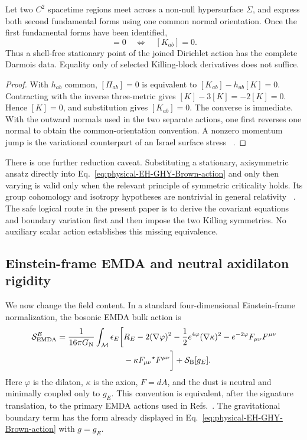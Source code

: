 \begin{proposition}
\label{prop:physical-Darmois-momentum}
Let two $C^2$ spacetime regions meet across a non-null hypersurface
$\Sigma$, and express both second fundamental forms using one common normal
orientation. Once the first fundamental forms have been identified,
\begin{equation}
 [\Pi_{ab}]=0
 \quad\Longleftrightarrow\quad
 [K_{ab}]=0.
 \label{eq:physical-momentum-Darmois-equivalence}
\end{equation}
Thus a shell-free stationary point of the joined Dirichlet action has the
complete Darmois data. Equality only of selected Killing-block derivatives
does not suffice.
\end{proposition}

\begin{proof}
With $h_{ab}$ common, $[\Pi_{ab}]=0$ is equivalent to
$[K_{ab}]-h_{ab}[K]=0$. Contracting with the inverse three-metric gives
$[K]-3[K]=-2[K]=0$. Hence $[K]=0$, and substitution gives
$[K_{ab}]=0$. The converse is immediate. With the outward normals used in
the two separate actions, one first reverses one normal to obtain the
common-orientation convention. A nonzero momentum jump is the variational
counterpart of an Israel surface stress
~\cite{Darmois1927,Israel1966NCB,MarsSenovilla1993CQG}.
\end{proof}

There is one further reduction caveat. Substituting a stationary,
axisymmetric ansatz directly into
Eq.~\eqref{eq:physical-EH-GHY-Brown-action} and only then varying is valid
only when the relevant principle of symmetric criticality holds. Its group
cohomology and isotropy hypotheses are nontrivial in general relativity
~\cite{FelsTorre2002CQG}. The safe logical route in the present paper is to
derive the covariant equations and boundary variation first and then impose
the two Killing symmetries. No auxiliary scalar action establishes this
missing equivalence.

\subsection{Einstein-frame EMDA and neutral axidilaton rigidity}

We now change the field content. In a standard four-dimensional
Einstein-frame normalization, the bosonic EMDA bulk action is
\begin{align}
 \mathcal S_{\rm EMDA}^{E}
 =\frac{1}{16\pi G_{\rm N}}\int_{\mathcal M}\epsilon_E
 \bigg[&R_E-2(\nabla\varphi)^2
 -\frac12e^{4\varphi}(\nabla\kappa)^2
 -e^{-2\varphi}F_{\mu\nu}F^{\mu\nu}
 \nonumber\\
 &-\kappa F_{\mu\nu}{}^\star F^{\mu\nu}\bigg]
 +\mathcal S_{\rm B}[g_E].
 \label{eq:physical-EMDA-action}
\end{align}
Here $\varphi$ is the dilaton, $\kappa$ is the axion, $F=dA$, and the
dust is neutral and minimally coupled only to $g_E$. This convention is
equivalent, after the signature translation, to the primary EMDA actions
used in Refs.~\cite{GarciaGaltsovKechkin1995PRL,GaltsovKechkin1994PRD}.
The gravitational boundary term has the form already displayed in
Eq.~\eqref{eq:physical-EH-GHY-Brown-action} with $g=g_E$.


